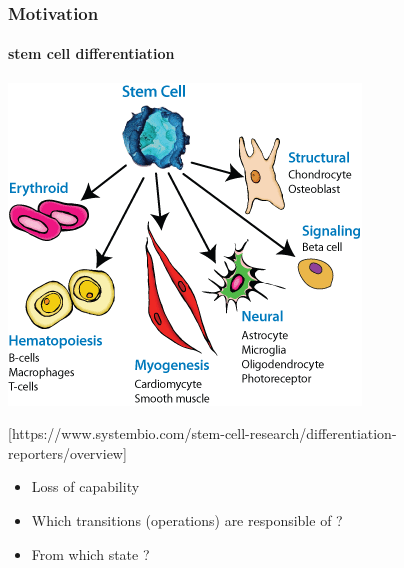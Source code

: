 \begin{frame}[c]
  \frametitle{Motivation}
 \framesubtitle{stem cell differentiation}

\begin{center}
  \includegraphics[scale=0.42]{images/illustration_differentiation.png}
\end{center}
\begin{center}
{\tiny \color{darkgreen} [https://www.systembio.com/stem-cell-research/differentiation-reporters/overview]}
\end{center}

\begin{itemize}
\item Loss of  capability   %
\item Which transitions (operations) are responsible of  ? 
\item From which state ?
\end{itemize}
\end{frame}


